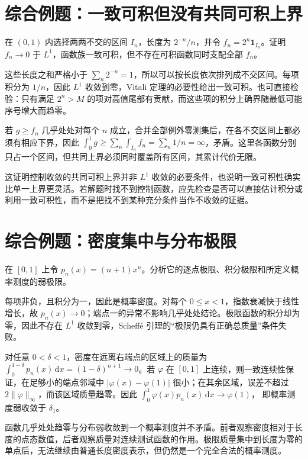 \documentclass[UTF8,12pt,a4paper,fontset=fandol]{ctexbook}
\begin{document}
\section{综合例题：一致可积但没有共同可积上界}
\begin{example}
在 $(0,1)$ 内选择两两不交的区间 $I_n$，长度为 $2^{-n}/n$，并令 $f_n=2^n\mathbf1_{I_n}$。证明 $f_n\to0$ 于 $L^1$，函数族一致可积，但不存在可积函数同时支配全部 $f_n$。
\end{example}
\begin{solve}
这些长度之和严格小于 $\sum_n2^{-n}=1$，所以可以按长度依次排列成不交区间。每项积分为 $1/n$，因此 $L^1$ 收敛到零，Vitali 定理的必要性给出一致可积。也可直接检验：只有满足 $2^n>M$ 的项对高值尾部有贡献，而这些项的积分上确界随最低可能序号增大而趋零。

若 $g\geq f_n$ 几乎处处对每个 $n$ 成立，合并全部例外零测集后，在各不交区间上都必须有相应下界，因此
$\int_0^1g\geq\sum_n\int_{I_n}f_n=\sum_n1/n=\infty$，矛盾。这里各函数分别只占一个区间，但共同上界必须同时覆盖所有区间，其累计代价无限。
\end{solve}
这证明控制收敛的共同可积上界并非 $L^1$ 收敛的必要条件，也说明一致可积性确实比单一上界更灵活。若解题时找不到控制函数，应先检查是否可以直接估计积分或利用一致可积性，而不是把找不到某种充分条件当作不收敛的证据。

\section{综合例题：密度集中与分布极限}
\begin{example}
在 $[0,1]$ 上令 $p_n(x)=(n+1)x^n$。分析它的逐点极限、积分极限和所定义概率测度的弱极限。
\end{example}
\begin{solve}
每项非负，且积分为一，因此是概率密度。对每个 $0\leq x<1$，指数衰减快于线性增长，故 $p_n(x)\to0$；端点一的异常不影响几乎处处结论。极限函数的积分却为零，因此不存在 $L^1$ 收敛到零，Scheffé 引理的“极限仍具有正确总质量”条件失败。

对任意 $0<\delta<1$，密度在远离右端点的区域上的质量为
$\int_0^{1-\delta}p_n(x)\,\mathrm dx=(1-\delta)^{n+1}\to0$。若 $\varphi$ 在 $[0,1]$ 上连续，则一致连续性保证，在足够小的端点邻域中 $|\varphi(x)-\varphi(1)|$ 很小；在其余区域，误差不超过 $2\|\varphi\|_\infty$，而该区域质量趋零。因此
$\int_0^1\varphi(x)p_n(x)\,\mathrm dx\to\varphi(1)$，
即概率测度弱收敛于 $\delta_1$。
\end{solve}
函数几乎处处趋零与分布弱收敛到一个概率测度并不矛盾。前者观察密度相对于长度的点态数值，后者观察质量对连续测试函数的作用。极限质量集中到长度为零的单点后，无法继续由普通长度密度表示，但仍然是一个完全合法的概率测度。
\end{document}
